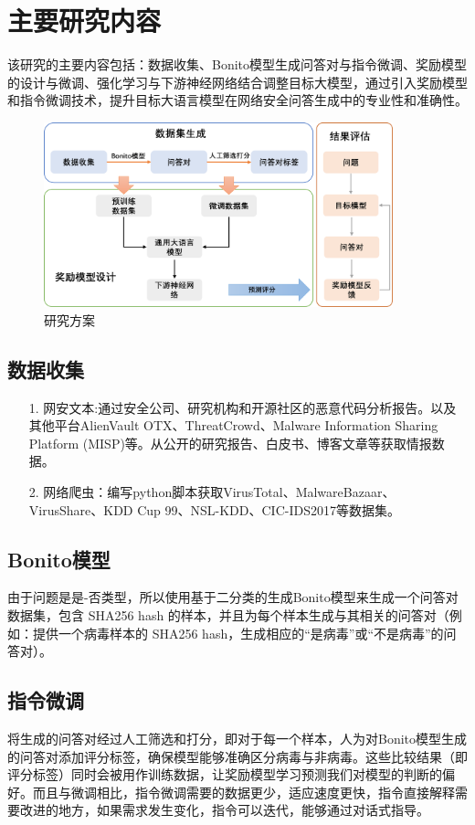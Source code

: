 \section{主要研究内容}
该研究的主要内容包括：数据收集、Bonito模型生成问答对与指令微调、奖励模型的设计与微调、强化学习与下游神经网络结合调整目标大模型，通过引入奖励模型和指令微调技术，提升目标大语言模型在网络安全问答生成中的专业性和准确性。
\begin{figure}[htbp]
    \centering
    \includegraphics[width=0.9\textwidth]{./img/liucheng.png}
    \caption{研究方案}\label{fig:研究方案}
\end{figure}
\subsection{数据收集}
\begin{itemize}
    \item[1.] 网安文本:通过安全公司、研究机构和开源社区的恶意代码分析报告。以及其他平台AlienVault OTX、ThreatCrowd、Malware Information Sharing Platform (MISP)等。从公开的研究报告、白皮书、博客文章等获取情报数据。
    \item[2.] 网络爬虫：编写python脚本获取VirusTotal、MalwareBazaar、VirusShare、KDD Cup 99、NSL-KDD、CIC-IDS2017等数据集。
\end{itemize}
\subsection{Bonito模型}
由于问题是是-否类型，所以使用基于二分类的生成Bonito模型来生成一个问答对数据集，包含 SHA256 hash 的样本，并且为每个样本生成与其相关的问答对（例如：提供一个病毒样本的 SHA256 hash，生成相应的“是病毒”或“不是病毒”的问答对）。

\subsection{指令微调}
将生成的问答对经过人工筛选和打分，即对于每一个样本，人为对Bonito模型生成的问答对添加评分标签，确保模型能够准确区分病毒与非病毒。这些比较结果（即评分标签）同时会被用作训练数据，让奖励模型学习预测我们对模型的判断的偏好。而且与微调相比，指令微调需要的数据更少，适应速度更快\cite{pmlr-v202-longpre23a}，指令直接解释需要改进的地方，如果需求发生变化，指令可以迭代，能够通过对话式指导。


